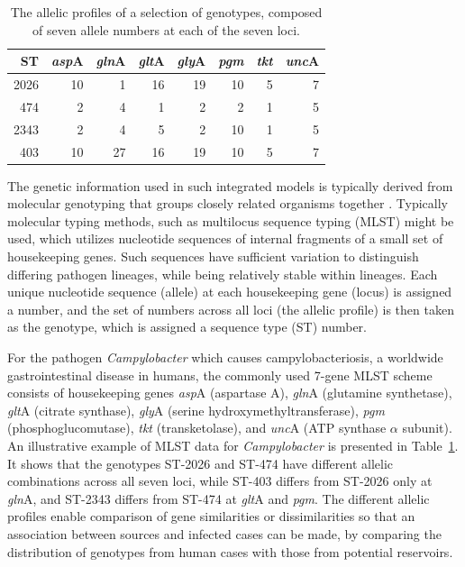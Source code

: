 \documentclass[AMA,STIX1COL]{WileyNJD-v2}
\begin{document}
\begin{table}
  \begin{center}
	\begin{tabular}{rrrrrrrr}
	\toprule
	ST & \textit{asp}A & \textit{gln}A & \textit{glt}A & \textit{gly}A & \textit{pgm} & \textit{tkt} & \textit{unc}A\\
	\midrule
	2026 & 10 & 1 & 16 & 19 & 10 & 5 & 7\\
	474 & 2 & 4 & 1 & 2 & 2 & 1 & 5\\
	2343 & 2 & 4 & 5 & 2 & 10 & 1 & 5\\
	403 & 10 & 27 & 16 & 19 & 10 & 5 & 7\\
	\bottomrule
	\end{tabular}
  \end{center}
  \caption{The allelic profiles of a selection of genotypes, composed of seven allele numbers at each of the seven loci.}
  \label{tab:mlst}
\end{table}

The genetic information used in such integrated models is typically derived from molecular genotyping that groups closely related organisms together \cite{Cotta}. Typically molecular typing methods, such as multilocus sequence typing (MLST) \cite{Dingl, Coll, Urwin} might be used, which utilizes nucleotide sequences of internal fragments of a small set of housekeeping genes. Such sequences have sufficient variation to distinguish differing pathogen lineages, while being relatively stable within lineages. Each unique nucleotide sequence (allele) at each housekeeping gene (locus) is assigned a number, and the set of numbers across all loci (the allelic profile) is then taken as the genotype, which is assigned a sequence type (ST) number.

For the pathogen \textit{Campylobacter} which causes campylobacteriosis, a worldwide gastrointestinal disease in humans, the commonly used 7-gene MLST scheme consists of housekeeping genes \textit{asp}A (aspartase A), \textit{gln}A (glutamine synthetase), \textit{glt}A (citrate synthase), \textit{gly}A (serine hydroxymethyltransferase), \textit{pgm} (phosphoglucomutase), \textit{tkt} (transketolase), and \textit{unc}A (ATP synthase $\alpha$ subunit). An illustrative example of MLST data for \emph{Campylobacter} is presented in Table~\ref{tab:mlst}. It shows that the genotypes ST-2026 and ST-474 have different allelic combinations across all seven loci, while ST-403 differs from ST-2026 only at \textit{gln}A, and ST-2343 differs from ST-474 at \textit{glt}A and \textit{pgm}. The different allelic profiles enable comparison of gene similarities or dissimilarities so that an association between sources and infected cases can be made, by comparing the distribution of genotypes from human cases with those from potential reservoirs.
\end{document}
